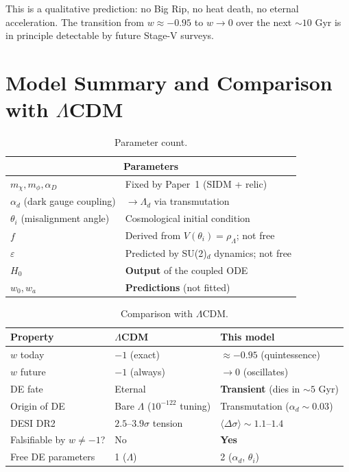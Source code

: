 \documentclass[11pt,a4paper]{article}
\newcommand{\Ld}{\Lambda_d}
\begin{document}
This is a qualitative prediction: no Big Rip, no heat death, no eternal acceleration.
The transition from $w \approx -0.95$ to $w \to 0$ over the next $\sim10$ Gyr 
is in principle detectable by future Stage-V surveys.

\section{Model Summary and Comparison with $\Lambda$CDM}
\label{sec:summary}

\begin{table}[H]
\centering
\caption{Parameter count.}
\begin{tabular}{@{}ll@{}}
\toprule
\multicolumn{2}{c}{\textbf{Parameters}} \\
\midrule
$m_\chi, m_\phi, \alpha_D$ & Fixed by Paper~1 (SIDM + relic) \\
$\alpha_d$ (dark gauge coupling) & $\to \Ld$ via transmutation \\
$\theta_i$ (misalignment angle) & Cosmological initial condition \\
\midrule
$f$ & Derived from $V(\theta_i) = \rho_\Lambda$; not free \\
$\varepsilon$ & Predicted by SU(2)$_d$ dynamics; not free \\
$H_0$ & \textbf{Output} of the coupled ODE \\
$w_0, w_a$ & \textbf{Predictions} (not fitted) \\
\bottomrule
\end{tabular}
\end{table}

\begin{table}[H]
\centering
\caption{Comparison with $\Lambda$CDM.}
\begin{tabular}{@{}lll@{}}
\toprule
Property & $\Lambda$CDM & This model \\
\midrule
$w$ today & $-1$ (exact) & $\approx -0.95$ (quintessence) \\
$w$ future & $-1$ (always) & $\to 0$ (oscillates) \\
DE fate & Eternal & \textbf{Transient} (dies in $\sim5$ Gyr) \\
Origin of DE & Bare $\Lambda$ ($10^{-122}$ tuning) & Transmutation ($\alpha_d \sim 0.03$) \\
DESI DR2 & $2.5$--$3.9\sigma$ tension & $\langle\Delta\sigma\rangle \sim 1.1$--$1.4$ \\
Falsifiable by $w \neq -1$? & No & \textbf{Yes} \\
Free DE parameters & 1 ($\Lambda$) & 2 ($\alpha_d$, $\theta_i$) \\
\bottomrule
\end{tabular}
\end{table}
\end{document}
